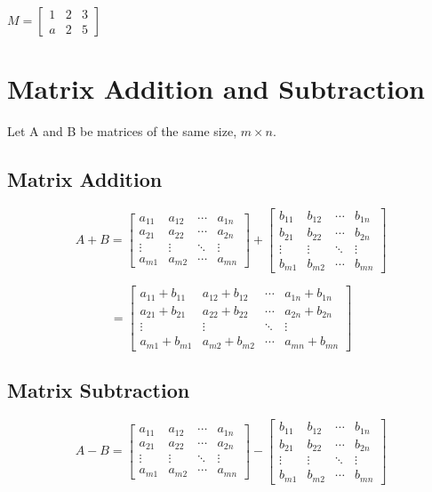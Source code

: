 \documentclass{article}
\begin{document}
$M = \begin{bmatrix}
 1 & 2 & 3 \\ 
 a & 2 & 5 
\end{bmatrix}$

\section{Matrix Addition and Subtraction}

Let A and B be matrices of the same size, $m \times n$. 

\subsection{Matrix Addition}

\[
A + B = 
\begin{bmatrix} 
a_{11} & a_{12} & \cdots & a_{1n} \\
a_{21} & a_{22} & \cdots & a_{2n} \\
\vdots & \vdots & \ddots & \vdots \\
a_{m1} & a_{m2} & \cdots & a_{mn}
\end{bmatrix} +
\begin{bmatrix} 
b_{11} & b_{12} & \cdots & b_{1n} \\
b_{21} & b_{22} & \cdots & b_{2n} \\
\vdots & \vdots & \ddots & \vdots \\
b_{m1} & b_{m2} & \cdots & b_{mn}
\end{bmatrix}
\]

\[
= \begin{bmatrix} 
a_{11}+b_{11} & a_{12}+b_{12} & \cdots & a_{1n}+b_{1n} \\
a_{21}+b_{21} & a_{22}+b_{22} & \cdots & a_{2n}+b_{2n} \\
\vdots & \vdots & \ddots & \vdots \\
a_{m1}+b_{m1} & a_{m2}+b_{m2} & \cdots & a_{mn}+b_{mn}
\end{bmatrix}
\]

\subsection{Matrix Subtraction}

\[
A - B = 
\begin{bmatrix} 
a_{11} & a_{12} & \cdots & a_{1n} \\
a_{21} & a_{22} & \cdots & a_{2n} \\
\vdots & \vdots & \ddots & \vdots \\
a_{m1} & a_{m2} & \cdots & a_{mn}
\end{bmatrix} -
\begin{bmatrix} 
b_{11} & b_{12} & \cdots & b_{1n} \\
b_{21} & b_{22} & \cdots & b_{2n} \\
\vdots & \vdots & \ddots & \vdots \\
b_{m1} & b_{m2} & \cdots & b_{mn}
\end{bmatrix}
\]
\end{document}
